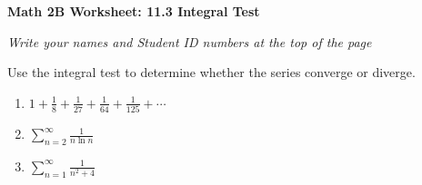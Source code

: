 \documentclass[12pt,fleqn]{article}
\begin{document}
\begin{center}
	\textbf{Math 2B Worksheet: 11.3 Integral Test}
\end{center}

\emph{Write your names and Student ID numbers at the top of the page}

Use the integral test to determine whether the series converge or diverge.
\begin{enumerate}
\item $\displaystyle 1+\frac{1}{8}+\frac{1}{27}+\frac{1}{64}+\frac{1}{125}+\cdots$\vfill

\item $\displaystyle\sum_{n=2}^\infty\frac{1}{n\ln n}$\vfill

\item $\displaystyle\sum_{n=1}^\infty\frac{1}{n^2+4}$\vfill



\end{enumerate}
\end{document}

